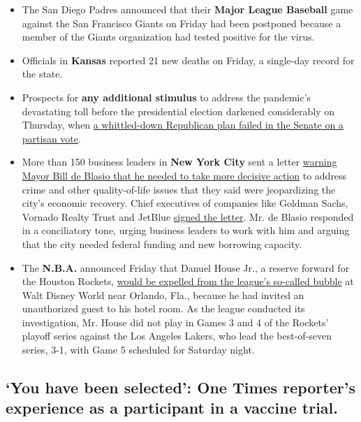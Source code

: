 \begin{itemize}
\item
  The San Diego Padres announced that their \textbf{Major League
  Baseball} game against the San Francisco Giants on Friday had been
  postponed because a member of the Giants organization had tested
  positive for the virus.
\item
  Officials in \textbf{Kansas} reported 21 new deaths on Friday, a
  single-day record for the state.
\item
  Prospects for \textbf{any additional stimulus} to address the
  pandemic's devastating toll before the presidential election darkened
  considerably on Thursday, when
  \href{https://www.nytimes3xbfgragh.onion/2020/09/10/us/politics/second-stimulus-check.html}{a
  whittled-down Republican plan failed in the Senate on a partisan
  vote}.
\item
  More than 150 business leaders in \textbf{New York City} sent a letter
  \href{https://www.nytimes3xbfgragh.onion/2020/09/10/nyregion/de-blasio-economy-coronavirus.html}{warning
  Mayor Bill de Blasio that he needed to take more decisive action} to
  address crime and other quality-of-life issues that they said were
  jeopardizing the city's economic recovery. Chief executives of
  companies like Goldman Sachs, Vornado Realty Trust and JetBlue
  \href{https://pfnyc.org/news/letter-to-mayor-bill-de-blasio-from-nyc-business-leaders/}{signed
  the letter}. Mr. de Blasio responded in a conciliatory tone, urging
  business leaders to work with him and arguing that the city needed
  federal funding and new borrowing capacity.
\item
  The \textbf{N.B.A.} announced Friday that Danuel House Jr., a reserve
  forward for the Houston Rockets,
  \href{https://www.nytimes3xbfgragh.onion/2020/09/11/sports/basketball/nba-houston-rockets-danuel-house.html}{would
  be expelled from the league's so-called bubble} at Walt Disney World
  near Orlando, Fla., because he had invited an unauthorized guest to
  his hotel room. As the league conducted its investigation, Mr. House
  did not play in Games 3 and 4 of the Rockets' playoff series against
  the Los Angeles Lakers, who lead the best-of-seven series, 3-1, with
  Game 5 scheduled for Saturday night.
\end{itemize}

\hypertarget{you-have-been-selected-one-times-reporters-experience-as-a-participant-in-a-vaccine-trial}{%
\subsection{`You have been selected': One Times reporter's experience as
a participant in a vaccine
trial.}\label{you-have-been-selected-one-times-reporters-experience-as-a-participant-in-a-vaccine-trial}}

